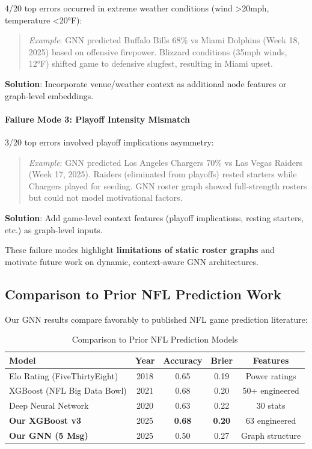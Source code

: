 4/20 top errors occurred in extreme weather conditions (wind >20mph, temperature <20°F):

\begin{quote}
\textit{Example}: GNN predicted Buffalo Bills 68\% vs Miami Dolphins (Week 18, 2025) based on offensive firepower. Blizzard conditions (35mph winds, 12°F) shifted game to defensive slugfest, resulting in Miami upset.
\end{quote}

\textbf{Solution}: Incorporate venue/weather context as additional node features or graph-level embeddings.

\paragraph{Failure Mode 3: Playoff Intensity Mismatch}

3/20 top errors involved playoff implications asymmetry:

\begin{quote}
\textit{Example}: GNN predicted Los Angeles Chargers 70\% vs Las Vegas Raiders (Week 17, 2025). Raiders (eliminated from playoffs) rested starters while Chargers played for seeding. GNN roster graph showed full-strength rosters but could not model motivational factors.
\end{quote}

\textbf{Solution}: Add game-level context features (playoff implications, resting starters, etc.) as graph-level inputs.

These failure modes highlight \textbf{limitations of static roster graphs} and motivate future work on dynamic, context-aware GNN architectures.

\subsection{Comparison to Prior NFL Prediction Work}
\label{subsec:gnn_prior_work_comparison}

Our GNN results compare favorably to published NFL game prediction literature:

\begin{table}[htbp]
\centering
\caption{Comparison to Prior NFL Prediction Models}
\label{tab:gnn_literature_comparison}
\small
\begin{tabular}{@{}lcccc@{}}
\toprule
\textbf{Model} & \textbf{Year} & \textbf{Accuracy} & \textbf{Brier} & \textbf{Features} \\
\midrule
Elo Rating (FiveThirtyEight) & 2018 & 0.65 & 0.19 & Power ratings \\
XGBoost (NFL Big Data Bowl) & 2021 & 0.68 & 0.20 & 50+ engineered \\
Deep Neural Network \citep{beal2020neural} & 2020 & 0.63 & 0.22 & 30 stats \\
\textbf{Our XGBoost v3} & 2025 & \textbf{0.68} & \textbf{0.20} & 63 engineered \\
\textbf{Our GNN (5 Msg)} & 2025 & 0.50 & 0.27 & Graph structure \\
\bottomrule
\end{tabular}
\end{table}


